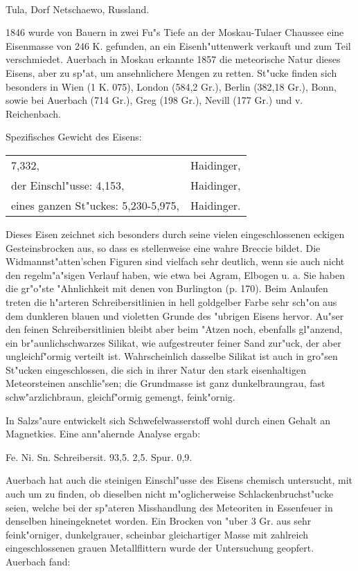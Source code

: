 \documentclass[a4paper, 11pt, oneside]{article}
\begin{document}
\paragraph{}
Tula, Dorf Netschaewo, Russland.

1846 wurde von Bauern in zwei Fu"s Tiefe an der Moskau-Tulaer Chaussee eine Eisenmasse von 246 K. gefunden, an ein Eisenh"uttenwerk verkauft und zum Teil verschmiedet. Auerbach in Moskau erkannte 1857 die meteorische Natur dieses Eisens, aber zu sp"at, um ansehnlichere Mengen zu retten. St"ucke finden sich besonders in Wien (1 K. 075), London (584,2 Gr.), Berlin (382,18 Gr.), Bonn, sowie bei Auerbach (714 Gr.), Greg (198 Gr.), Nevill (177 Gr.) und v. Reichenbach.

Spezifisches Gewicht des Eisens: 
\begin{table}[!ht]
    \centering
    \begin{tabular}{l l}
        7,332, & Haidinger,\\
        der Einschl"usse: 4,153, & Haidinger,\\
        eines ganzen St"uckes: 5,230-5,975, & Haidinger.
    \end{tabular}
\end{table}

Dieses Eisen zeichnet sich besonders durch seine vielen eingeschlossenen eckigen Gesteinsbrocken aus, so dass es stellenweise eine wahre Breccie bildet. Die Widmannst"atten'schen Figuren sind vielfach sehr deutlich, wenn sie auch nicht den regelm"a"sigen Verlauf haben, wie etwa bei Agram, Elbogen u. a. Sie haben die gr"o"ste "Ahnlichkeit mit denen von Burlington (p. 170). Beim Anlaufen treten die h"arteren Schreibersitlinien in hell goldgelber Farbe sehr sch"on aus dem dunkleren blauen und violetten Grunde des "ubrigen Eisens hervor. Au"ser den feinen Schreibersitlinien bleibt aber beim "Atzen noch, ebenfalls gl"anzend, ein br"aunlichschwarzes Silikat, wie aufgestreuter feiner Sand zur"uck, der aber ungleichf"ormig verteilt ist. Wahrscheinlich dasselbe Silikat ist auch in gro"sen St"ucken eingeschlossen, die sich in ihrer Natur den stark eisenhaltigen Meteorsteinen anschlie"sen; die Grundmasse ist ganz dunkelbraungrau, fast schw"arzlichbraun, gleichf"ormig gemengt, feink"ornig.

In Salzs"aure entwickelt sich Schwefelwasserstoff wohl durch einen Gehalt an Magnetkies. Eine ann"ahernde Analyse ergab:

Fe. Ni. Sn. Schreibersit.  
93,5. 2,5. Spur. 0,9.

Auerbach hat auch die steinigen Einschl"usse des Eisens chemisch untersucht, mit auch um zu finden, ob dieselben nicht m"oglicherweise Schlackenbruchst"ucke seien, welche bei der sp"ateren Misshandlung des Meteoriten in Essenfeuer in denselben hineingeknetet worden. Ein Brocken von "uber 3 Gr. aus sehr feink"orniger, dunkelgrauer, scheinbar gleichartiger Masse mit zahlreich eingeschlossenen grauen Metallflittern wurde der Untersuchung geopfert. Auerbach fand:
\end{document}
